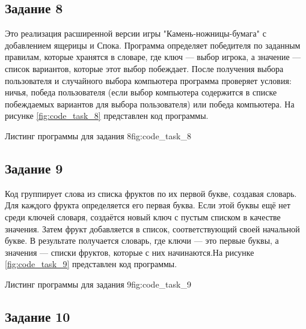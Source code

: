 \documentclass[]{vvsu}
\begin{document}
\subsection{Задание 8}

Это реализация расширенной версии игры "Камень-ножницы-бумага" с добавлением ящерицы и Спока. Программа определяет победителя по заданным правилам, которые хранятся в словаре, где ключ — выбор игрока, а значение — список вариантов, которые этот выбор побеждает. После получения выбора пользователя и случайного выбора компьютера программа проверяет условия: ничья, победа пользователя (если выбор компьютера содержится в списке побеждаемых вариантов для выбора пользователя) или победа компьютера. На рисунке \ref{fig:code_task_8} представлен код программы.

\begin{vvsu_figure}{Листинг программы для задания 8}{fig:code_task_8}
  \begin{minipage}{.75\textwidth}
    
  \end{minipage}
\end{vvsu_figure}

\subsection{Задание 9}
 Код группирует слова из списка фруктов по их первой букве, создавая словарь. Для каждого фрукта определяется его первая буква. Если этой буквы ещё нет среди ключей словаря, создаётся новый ключ с пустым списком в качестве значения. Затем фрукт добавляется в список, соответствующий своей начальной букве. В результате получается словарь, где ключи — это первые буквы, а значения — списки фруктов, которые с них начинаются.На рисунке \ref{fig:code_task_9} представлен код программы.

\begin{vvsu_figure}{Листинг программы для задания 9}{fig:code_task_9}
  \begin{minipage}{.75\textwidth}
    
  \end{minipage}
\end{vvsu_figure}

\subsection{Задание 10}
\end{document}
